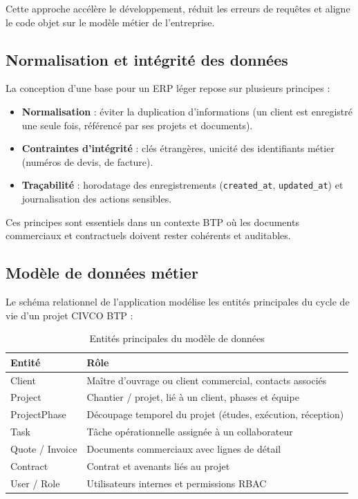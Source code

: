 Cette approche accélère le développement, réduit les erreurs de requêtes et aligne le
code objet sur le modèle métier de l'entreprise.

\subsection{Normalisation et intégrité des données}

La conception d'une base pour un ERP léger repose sur plusieurs principes :

\begin{itemize}
  \item \textbf{Normalisation} : éviter la duplication d'informations (un client est
  enregistré une seule fois, référencé par ses projets et documents).
  \item \textbf{Contraintes d'intégrité} : clés étrangères, unicité des identifiants
  métier (numéros de devis, de facture).
  \item \textbf{Traçabilité} : horodatage des enregistrements (\texttt{created\_at},
  \texttt{updated\_at}) et journalisation des actions sensibles.
\end{itemize}

Ces principes sont essentiels dans un contexte BTP où les documents commerciaux et
contractuels doivent rester cohérents et auditables.

\subsection{Modèle de données métier}

Le schéma relationnel de l'application modélise les entités principales du cycle de
vie d'un projet CIVCO BTP :

\begin{table}[H]
\centering
\small
\caption{Entités principales du modèle de données}
\label{tab:entities}
\begin{tabular}{|l|p{9cm}|}
\hline
\textbf{Entité} & \textbf{Rôle} \\
\hline
Client & Maître d'ouvrage ou client commercial, contacts associés \\
\hline
Project & Chantier / projet, lié à un client, phases et équipe \\
\hline
ProjectPhase & Découpage temporel du projet (études, exécution, réception) \\
\hline
Task & Tâche opérationnelle assignée à un collaborateur \\
\hline
Quote / Invoice & Documents commerciaux avec lignes de détail \\
\hline
Contract & Contrat et avenants liés au projet \\
\hline
User / Role & Utilisateurs internes et permissions RBAC \\
\hline
\end{tabular}
\end{table}

